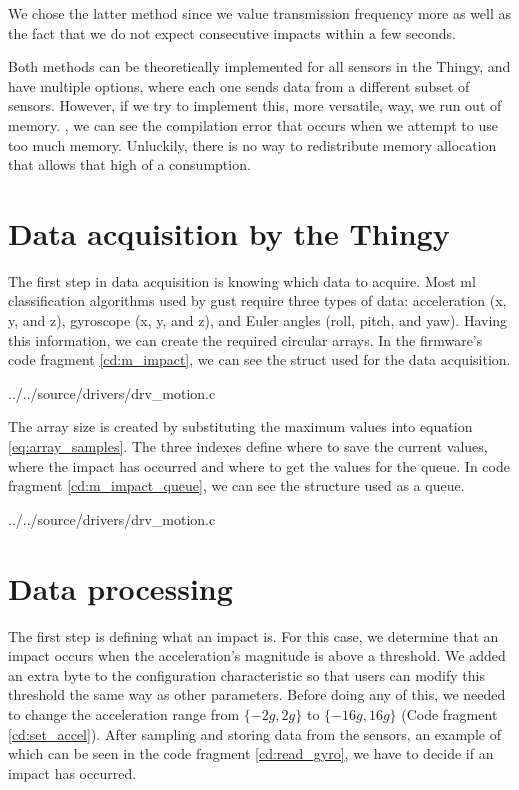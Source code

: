 We chose the latter method since we value transmission frequency more as well as the fact that we do not expect consecutive impacts within a few seconds.

Both methods can be theoretically implemented for all sensors in the Thingy, and have multiple options, where each one sends data from a different subset of sensors. However, if we try to implement this, more versatile, way, we run out of memory. , we can see the compilation error that occurs when we attempt to use too much memory. Unluckily, there is no way to redistribute memory allocation that allows that high of a consumption.

\section{Data acquisition by the Thingy}

The first step in data acquisition is knowing which data to acquire. Most \gls{ml} classification algorithms used by \gls{gust} require three types of data: acceleration (x, y, and z), gyroscope (x, y, and z), and Euler angles (roll, pitch, and yaw). Having this information, we can create the required circular arrays.  In the firmware's code fragment \ref{cd:m_impact}, we can see the struct used for the data acquisition.


{../../source/drivers/drv_motion.c}

The array size is created by substituting the maximum values into equation \ref{eq:array_samples}. The three indexes define where to save the current values, where the impact has occurred and where to get the values for the queue. In code fragment \ref{cd:m_impact_queue}, we can see the structure used as a queue.


{../../source/drivers/drv_motion.c}

\section{Data processing}
The first step is defining what an impact is. For this case, we determine that an impact occurs when the acceleration's magnitude is above a threshold. We added an extra byte to the configuration characteristic so that users can modify this threshold the same way as other parameters. Before doing any of this, we needed to change the acceleration range from  $\{-2g, 2g\}$ to $\{-16g, 16g\}$ (Code fragment \ref{cd:set_accel}). After sampling and storing data from the sensors, an example of which can be seen in the code fragment \ref{cd:read_gyro}, we have to decide if an impact has occurred.

